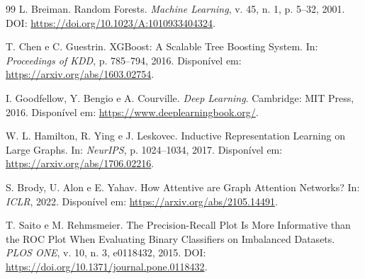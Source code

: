 \documentclass[12pt]{article}
\begin{document}
\begin{thebibliography}{99}
L. Breiman.
\newblock Random Forests.
\newblock \textit{Machine Learning}, v. 45, n. 1, p. 5--32, 2001.
\newblock DOI: \url{https://doi.org/10.1023/A:1010933404324}.

T. Chen e C. Guestrin.
\newblock XGBoost: A Scalable Tree Boosting System.
\newblock In: \textit{Proceedings of KDD}, p. 785--794, 2016.
\newblock Disponível em:
\url{https://arxiv.org/abs/1603.02754}.

I. Goodfellow, Y. Bengio e A. Courville.
\newblock \textit{Deep Learning}.
\newblock Cambridge: MIT Press, 2016.
\newblock Disponível em: \url{https://www.deeplearningbook.org/}.

W. L. Hamilton, R. Ying e J. Leskovec.
\newblock Inductive Representation Learning on Large Graphs.
\newblock In: \textit{NeurIPS}, p. 1024--1034, 2017.
\newblock Disponível em:
\url{https://arxiv.org/abs/1706.02216}.

S. Brody, U. Alon e E. Yahav.
\newblock How Attentive are Graph Attention Networks?
\newblock In: \textit{ICLR}, 2022.
\newblock Disponível em:
\url{https://arxiv.org/abs/2105.14491}.

T. Saito e M. Rehmsmeier.
\newblock The Precision-Recall Plot Is More Informative than the ROC
Plot When Evaluating Binary Classifiers on Imbalanced Datasets.
\newblock \textit{PLOS ONE}, v. 10, n. 3, e0118432, 2015.
\newblock DOI: \url{https://doi.org/10.1371/journal.pone.0118432}.

\end{thebibliography}
\end{document}
